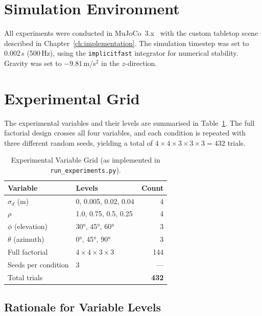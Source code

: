 \documentclass[11pt,a4paper]{report}
\begin{document}
\section{Simulation Environment}
\label{sec:sim_env}

All experiments were conducted in MuJoCo~3.x~\cite{todorov2012mujoco} with the custom tabletop scene described in Chapter~\ref{ch:implementation}. The simulation timestep was set to 0.002\,s (500\,Hz), using the \texttt{implicitfast} integrator for numerical stability. Gravity was set to $-9.81$\,m/s$^2$ in the $z$-direction.

\section{Experimental Grid}
\label{sec:grid}

The experimental variables and their levels are summarised in Table~\ref{tab:grid}. The full factorial design crosses all four variables, and each condition is repeated with three different random seeds, yielding a total of $4 \times 4 \times 3 \times 3 \times 3 = 432$ trials.

\begin{table}[t]
  \caption{Experimental Variable Grid (as implemented in \texttt{run\_experiments.py}).}
  \label{tab:grid}
  \centering
  \begin{tabular}{llr}
    \toprule
    \textbf{Variable} & \textbf{Levels} & \textbf{Count} \\
    \midrule
    $\sigma_d$ (m)      & 0, 0.005, 0.02, 0.04 & 4 \\
    $\rho$              & 1.0, 0.75, 0.5, 0.25 & 4 \\
    $\phi$ (elevation)  & 30°, 45°, 60°         & 3 \\
    $\theta$ (azimuth)  & 0°, 45°, 90°          & 3 \\
    \midrule
    Full factorial      & $4{\times}4{\times}3{\times}3$ & 144 \\
    Seeds per condition & 3 & --- \\
    Total trials        & & \textbf{432} \\
    \bottomrule
  \end{tabular}
\end{table}

\subsection{Rationale for Variable Levels}
\end{document}
